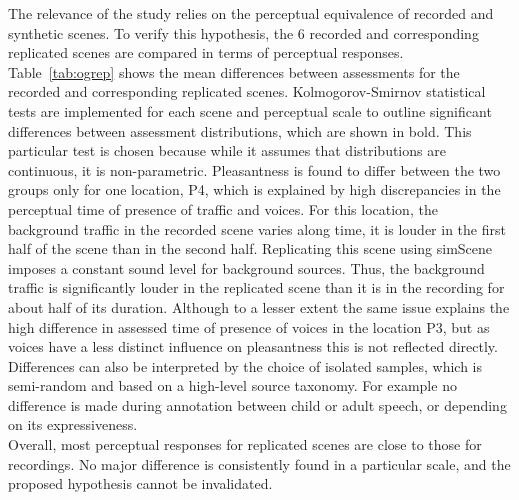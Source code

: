 \documentclass[11pt,a4paper]{article}
\begin{document}
The relevance of the study relies on the perceptual equivalence of recorded and synthetic scenes. To verify this hypothesis, the 6 recorded and corresponding replicated scenes are compared in terms of perceptual responses.\\

Table~\ref{tab:ogrep} shows the mean differences between assessments for the recorded and corresponding replicated scenes. Kolmogorov-Smirnov statistical tests are implemented for each scene and perceptual scale to outline significant differences between assessment distributions, which are shown in bold. This particular test is chosen because while it assumes that distributions are continuous, it is non-parametric. Pleasantness is found to differ between the two groups only for one location, P4, which is explained by high discrepancies in the perceptual time of presence of traffic and voices. For this location, the background traffic in the recorded scene varies along time, it is louder in the first half of the scene than in the second half. Replicating this scene using simScene imposes a constant sound level for background sources. Thus, the background traffic is significantly louder in the replicated scene than it is in the recording for about half
of its duration. Although to a lesser extent the same issue explains the high difference in assessed time of presence of voices in the location P3, but as voices have a less distinct influence on pleasantness this is not reflected directly. Differences can also be interpreted by the choice of isolated samples, which is semi-random and based on a high-level source taxonomy. For example no difference is made during annotation between child or adult speech, or depending on its expressiveness.\\

Overall, most perceptual responses for replicated scenes are close to those for recordings. No major difference is consistently found in a particular scale, and the proposed hypothesis cannot be invalidated.
\end{document}

